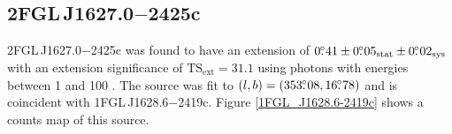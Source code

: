 \documentclass[12pt,preprint]{aastex}
\newcommand{\gev}{\text{GeV}\xspace}
\newcommand{\tsext}{{\ensuremath{\text{TS}_{\text{ext}}}}\xspace}
\newcommand{\sys}{\text{sys}\xspace}
\newcommand{\stat}{\text{stat}\xspace}
\begin{document}
%
    
\subsection{2FGL\,J1627.0$-$2425c}
\label{section_2FGL_J1627.0-2425c}


2FGL\,J1627.0$-$2425c was found  to
have an extension of $0\fdg41\pm0\fdg05_\stat\pm0\fdg02_\sys$ with
an extension significance of $\tsext=31.1$
using photons with energies between 1 \gev and 100 \gev.  The source
was fit to
$(l,b)=(353\mbox{$.\!\!^\circ$}08, 16\mbox{$.\!\!^\circ$}78)$ and is coincident with 
1FGL\,J1628.6$-$2419c.  
Figure \ref{1FGL_J1628.6-2419c} shows a counts map of this source.
\end{document}
